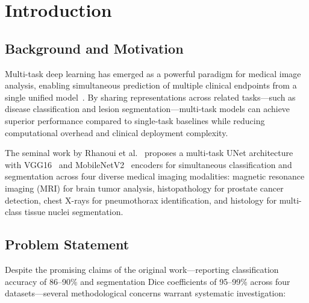 \documentclass[11pt,a4paper,twoside]{report}
\begin{document}
\chapter{Introduction}

\section{Background and Motivation}

Multi-task deep learning has emerged as a powerful paradigm for medical image analysis, enabling simultaneous prediction of multiple clinical endpoints from a single unified model~\cite{litjens2017survey, valanarasu2021transformer}. By sharing representations across related tasks---such as disease classification and lesion segmentation---multi-task models can achieve superior performance compared to single-task baselines while reducing computational overhead and clinical deployment complexity.

The seminal work by Rhanoui et al.~\cite{ranoui2025multi} proposes a multi-task UNet architecture~\cite{ronneberger2015unet} with VGG16~\cite{simonyan2014vgg} and MobileNetV2~\cite{sandler2018mobilenetv2} encoders for simultaneous classification and segmentation across four diverse medical imaging modalities: magnetic resonance imaging (MRI) for brain tumor analysis, histopathology for prostate cancer detection, chest X-rays for pneumothorax identification, and histology for multi-class tissue nuclei segmentation.

\section{Problem Statement}

Despite the promising claims of the original work---reporting classification accuracy of 86--90\% and segmentation Dice coefficients of 95--99\% across four datasets---several methodological concerns warrant systematic investigation:
\end{document}
